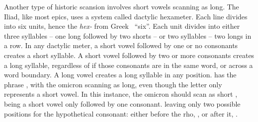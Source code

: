 

Another type of historic scansion involves short vowels scanning as long.  
The Iliad, like most epics, uses a system called dactylic hexameter. Each line divides into six units, hence the \textit{hex-} from Greek \ ``six''. Each unit divides into either three syllables -- one long followed by two shorts -- or two syllables -- two longs in a row.
In any dactylic meter, a short vowel followed by one or no consonants creates a short syllable. A short vowel followed by two or more consonants creates a long syllable, regardless of if those consonants are in the same word, or across a word boundary. A long vowel creates a long syllable in any position.   has the phrase , with the omicron  scanning as long, even though the letter only represents a short vowel.\autocite[V.803]{Iliad_1999} In this instance, the omicron should scan as short , being a short vowel only followed by one consonant.   leaving only two possible positions for the hypothetical consonant: either before the rho, , or after it, .

